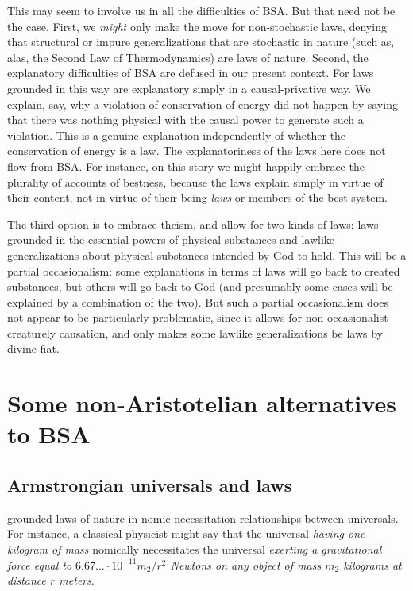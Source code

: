 This may seem to involve us in all the difficulties of BSA. But that need not be the case. First, we \textit{might} only make the move for
non-stochastic laws, denying that structural or impure generalizations that are stochastic in nature (such as, alas, the Second Law of 
Thermodynamics) are laws of nature. Second, the explanatory difficulties of BSA are defused in our present context. For 
laws grounded in this way are explanatory simply in a causal-privative way. We explain, say, why a violation of 
conservation of energy did not happen by saying that there was nothing physical with the causal power to generate such a 
violation. This is a genuine explanation independently of whether the conservation of energy is a law. The
explanatoriness of the laws here does not flow from BSA. For instance, on this story we might happily embrace the plurality of accounts of
bestness, because the laws explain simply in virtue of their content, not in virtue of their being \textit{laws}
or members of the best system.

The third option is to embrace theism, and allow for two kinds of laws: laws grounded in the essential powers of physical substances
and lawlike generalizations about physical substances intended by God to hold. This will be a partial occasionalism: some explanations
in terms of laws will go back to created substances, but others will go back to God (and presumably some cases will be explained by
a combination of the two). But such a partial occasionalism does not appear to be particularly problematic, since it
allows for non-occasionalist creaturely causation, and only makes some lawlike generalizations be laws by divine
fiat.

\section{Some non-Aristotelian alternatives to BSA}
\subsection{Armstrongian universals and laws}
 grounded laws of nature in nomic necessitation relationships between universals. For instance, 
a classical physicist might say that the universal
\textit{having one kilogram of mass} nomically necessitates the universal \textit{exerting a gravitational
force equal to $6.67... \cdot 10^{-11} m_2/r^2$ Newtons on any object of mass $m_2$ kilograms at 
distance $r$ meters}. 

